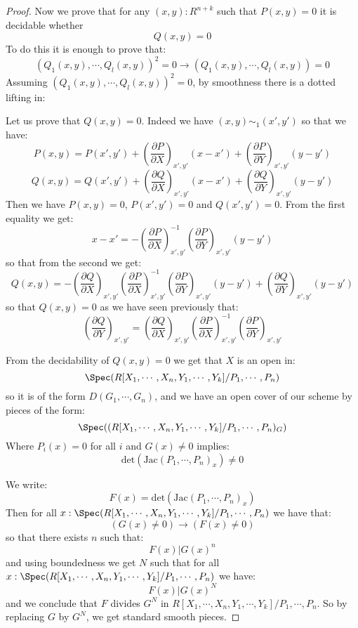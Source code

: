 \begin{proof}
Now we prove that for any $(x,y):R^{n+k}$ such that $P(x,y)=0$ it is decidable whether
\[Q(x,y)=0 \] 
To do this it is enough to prove that:
\[(Q_1(x,y),\cdots,Q_l(x,y))^2=0 \to (Q_1(x,y),\cdots,Q_l(x,y))=0\]
Assuming $(Q_1(x,y),\cdots,Q_l(x,y))^2=0$, by smoothness there is a dotted lifting in:
 \begin{center}
\end{center}
Let us prove that $Q(x,y) = 0$. Indeed we have $(x,y) \sim_1 (x',y')$ so that we have:
\[P(x,y) = P(x',y')+ \left(\frac{\partial P}{\partial X}\right)_{x',y'}(x-x') + \left(\frac{\partial P}{\partial Y}\right)_{x',y'}(y-y') \]
\[Q(x,y) = Q(x',y')+ \left(\frac{\partial Q}{\partial X}\right)_{x',y'}(x-x') + \left(\frac{\partial Q}{\partial Y}\right)_{x',y'}(y-y') \]
Then we have $P(x,y) = 0$, $P(x',y')=0$ and $Q(x',y') = 0$. From the first equality we get:
\[x-x' =  -\left(\frac{\partial P}{\partial X}\right)_{x',y'}^{-1}\left(\frac{\partial P}{\partial Y}\right)_{x',y'}(y-y')\]
so that from the second we get:
\[Q(x,y) = -\left(\frac{\partial Q}{\partial X}\right)_{x',y'}\left(\frac{\partial P}{\partial X}\right)_{x',y'}^{-1}\left(\frac{\partial P}{\partial Y}\right)_{x',y'}(y-y') + \left(\frac{\partial Q}{\partial Y}\right)_{x',y'}(y-y')\]
so that $Q(x,y)=0$ as we have seen previously that:
\[\left(\frac{\partial Q}{\partial Y}\right)_{x',y'} = \left(\frac{\partial Q}{\partial X}\right)_{x',y'}\left(\frac{\partial P}{\partial X}\right)_{x',y'}^{-1} \left(\frac{\partial P}{\partial Y}\right)_{x',y'} \]

From the decidability of $Q(x,y)=0$ we get that $X$ is an open in:
\[\Spec(R[X_1,\cdots,X_n,Y_1,\cdots,Y_k]/P_1,\cdots,P_n)\]
so it is of the form $D(G_1,\cdots,G_n)$, and we have an open cover of our scheme by pieces of the form:
    \[\Spec((R[X_1,\cdots,X_n,Y_1,\cdots,Y_k]/P_1,\cdots,P_n)_G)\]
    Where $P_i(x)=0$ for all $i$ and $G(x)\not=0$ implies:
    \[\mathrm{det}(\mathrm{Jac}(P_1,\cdots,P_n)_x)\not=0\]
    
    We write:
    \[F(x)=\mathrm{det}(\mathrm{Jac}(P_1,\cdots,P_n)_x)\]
    Then for all $x:\Spec(R[X_1,\cdots,X_n,Y_1,\cdots,Y_k]/P_1,\cdots,P_n)$ we have that:
    \[(G(x)\not=0) \to (F(x)\not=0)\]
    so that there exists $n$ such that:
    \[F(x) | G(x)^n\]
    and using boundedness we get $N$ such that for all $x:\Spec(R[X_1,\cdots,X_n,Y_1,\cdots,Y_k]/P_1,\cdots,P_n)$ we have:
    \[F(x) | G(x)^N\]
    and we conclude that $F$ divides $G^N$ in $R[X_1,\cdots,X_n,Y_1,\cdots,Y_k]/P_1,\cdots,P_n$. So by replacing $G$ by $G^N$, we get standard smooth pieces.
\end{proof}

